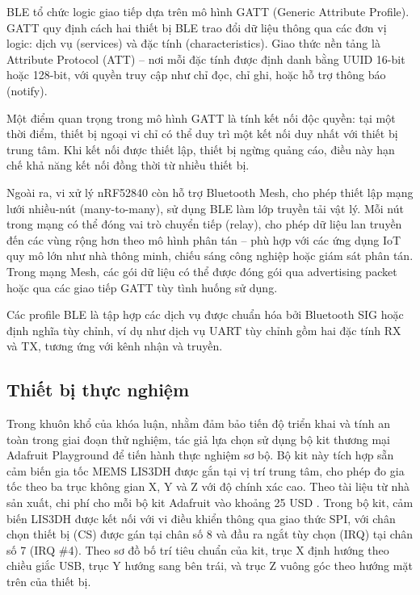 BLE tổ chức logic giao tiếp dựa trên mô hình GATT 
(Generic Attribute Profile). GATT quy định cách hai thiết bị BLE 
trao đổi dữ liệu thông qua các đơn vị logic: dịch vụ (services) 
và đặc tính (characteristics). Giao thức nền tảng là Attribute Protocol 
(ATT) – nơi mỗi đặc tính được định danh bằng UUID 16-bit hoặc 128-bit, 
với quyền truy cập như chỉ đọc, chỉ ghi, hoặc hỗ trợ thông báo (notify).

Một điểm quan trọng trong mô hình GATT là tính kết nối độc quyền: 
tại một thời điểm, thiết bị ngoại vi chỉ có thể duy trì một kết nối 
duy nhất với thiết bị trung tâm. Khi kết nối được thiết lập, thiết bị 
ngừng quảng cáo, điều này hạn chế khả năng kết nối đồng thời từ 
nhiều thiết bị.

Ngoài ra, vi xử lý nRF52840 còn hỗ trợ Bluetooth Mesh, cho phép thiết 
lập mạng lưới nhiều-nút (many-to-many), sử dụng BLE làm lớp truyền tải 
vật lý. Mỗi nút trong mạng có thể đóng vai trò chuyển tiếp (relay), 
cho phép dữ liệu lan truyền đến các vùng rộng hơn theo mô hình phân 
tán – phù hợp với các ứng dụng IoT quy mô lớn như nhà thông minh, 
chiếu sáng công nghiệp hoặc giám sát phân tán. Trong mạng Mesh, 
các gói dữ liệu có thể được đóng gói qua advertising packet hoặc 
qua các giao tiếp GATT tùy tình huống sử dụng.

Các profile BLE là tập hợp các dịch vụ được chuẩn hóa bởi Bluetooth 
SIG hoặc định nghĩa tùy chỉnh, ví dụ như dịch vụ UART tùy chỉnh gồm 
hai đặc tính RX và TX, tương ứng với kênh nhận và truyền.

\subsection{Thiết bị thực nghiệm}
Trong khuôn khổ của khóa luận, nhằm đảm bảo tiến độ triển khai và tính an 
toàn trong giai đoạn thử nghiệm, tác giả lựa chọn sử dụng bộ kit thương 
mại Adafruit Playground để tiến hành thực nghiệm sơ bộ. Bộ kit này tích 
hợp sẵn cảm biến gia tốc MEMS LIS3DH được gắn tại vị trí trung tâm, 
cho phép đo gia tốc theo ba trục không gian X, Y và Z với độ chính xác cao. 
Theo tài liệu từ nhà sản xuất, chi phí cho mỗi bộ kit Adafruit vào khoảng 
25 USD \cite{ada_overview}. Trong bộ kit, cảm biến LIS3DH được kết nối với 
vi điều khiển thông qua giao thức SPI, với chân chọn thiết bị (CS) được 
gán tại chân số 8 và đầu ra ngắt tùy chọn (IRQ) tại chân số 7 (IRQ \#4). 
Theo sơ đồ bố trí tiêu chuẩn của kit, trục X định hướng theo chiều giắc 
USB, trục Y hướng sang bên trái, và trục Z vuông góc theo hướng mặt trên 
của thiết bị.

